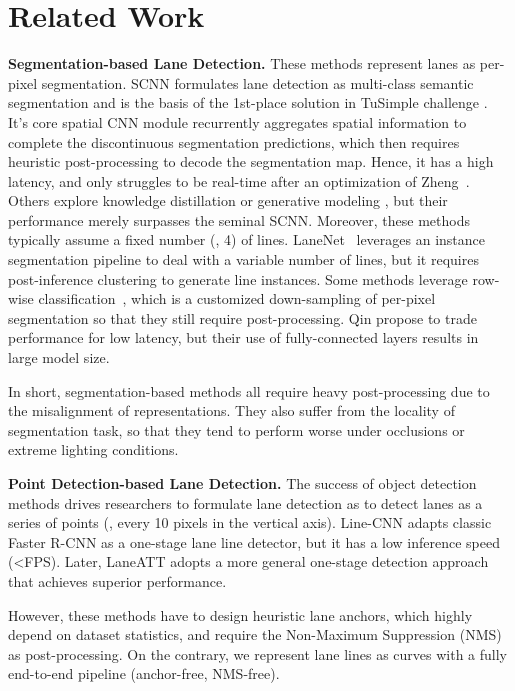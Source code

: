 \documentclass[10pt,twocolumn,letterpaper]{article}
\begin{document}
\section{Related Work}
\label{sec:relat}


\noindent \textbf{Segmentation-based Lane Detection.} These methods represent lanes as per-pixel segmentation. SCNN \cite{pan2018spatial} formulates lane detection as multi-class semantic segmentation and is the basis of the 1st-place solution in TuSimple challenge \cite{tusimple}. It's core spatial CNN module recurrently aggregates spatial information to complete the discontinuous segmentation predictions, which then requires heuristic post-processing to decode the segmentation map. Hence, it has a high latency, and only struggles to be real-time after an optimization of Zheng~\etal \cite{zheng2021resa}. Others explore knowledge distillation \cite{hou2019learning} or generative modeling \cite{ghafoorian2018gan}, but their performance merely surpasses the seminal SCNN. Moreover, these methods typically assume a fixed number (\eg, 4) of lines. LaneNet~\cite{neven2018towards} leverages an instance segmentation pipeline to deal with a variable number of lines, but it requires post-inference clustering to generate line instances.
Some methods leverage row-wise classification~\cite{yoo2020end,qin2020ultra}, which is a customized down-sampling of per-pixel segmentation so that they still require post-processing. 
Qin \etal \cite{qin2020ultra} propose to trade performance for low latency, but their use of fully-connected layers results in large model size.

In short, segmentation-based methods all require heavy post-processing due to the misalignment of representations. They also suffer from the locality of segmentation task, so that they tend to perform worse under occlusions or extreme lighting conditions.


\noindent \textbf{Point Detection-based Lane Detection.}
The success of object detection methods drives researchers to formulate lane detection as to detect lanes as a series of points (\eg, every 10 pixels in the vertical axis). Line-CNN \cite{li2019line} adapts classic Faster R-CNN \cite{ren2015faster} as a one-stage lane line detector, but it has a low inference speed (\textless  FPS). Later, LaneATT \cite{tabelini2021keep} adopts a more general one-stage detection approach that achieves superior performance. 

However, these methods have to design heuristic lane anchors, which highly depend on dataset statistics, and require the Non-Maximum Suppression (NMS) as post-processing. On the contrary, we represent lane lines as curves with a fully end-to-end pipeline (anchor-free, NMS-free).
\end{document}
